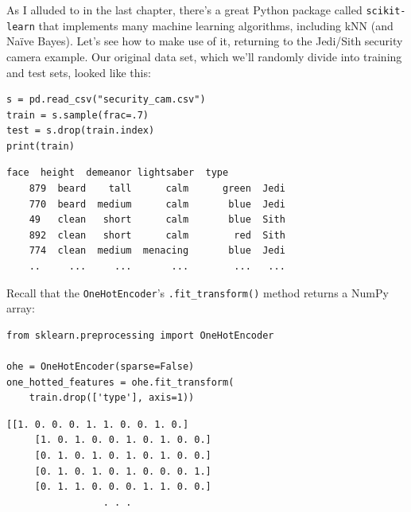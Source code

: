 
As I alluded to in the last chapter, there's a great Python package called
\texttt{scikit-learn} that implements many machine learning algorithms,
including kNN (and Na\"{i}ve Bayes). Let's see how to make use of it, returning
to the Jedi/Sith security camera example. Our original data set, which we'll
randomly divide into training and test sets, looked like this:

\begin{Verbatim}[fontsize=\small,samepage=true,frame=single,framesep=3mm]
s = pd.read_csv("security_cam.csv")
train = s.sample(frac=.7)
test = s.drop(train.index)
print(train)
\end{Verbatim}
\vspace{-.2in}

\begin{Verbatim}[fontsize=\small,samepage=true,frame=leftline,framesep=5mm,framerule=1mm]
          face  height  demeanor lightsaber  type
    879  beard    tall      calm      green  Jedi
    770  beard  medium      calm       blue  Jedi
    49   clean   short      calm       blue  Sith
    892  clean   short      calm        red  Sith
    774  clean  medium  menacing       blue  Jedi
    ..     ...     ...       ...        ...   ...
\end{Verbatim}


Recall that the \texttt{OneHotEncoder}'s \texttt{.fit\_transform()} method
returns a NumPy array:


\begin{Verbatim}[fontsize=\small,samepage=true,frame=single,framesep=3mm]
from sklearn.preprocessing import OneHotEncoder

ohe = OneHotEncoder(sparse=False)
one_hotted_features = ohe.fit_transform(
    train.drop(['type'], axis=1))
\end{Verbatim}
\vspace{-.2in}

\begin{Verbatim}[fontsize=\small,samepage=true,frame=leftline,framesep=5mm,framerule=1mm]
    [[1. 0. 0. 0. 1. 1. 0. 0. 1. 0.]
     [1. 0. 1. 0. 0. 1. 0. 1. 0. 0.]
     [0. 1. 0. 1. 0. 1. 0. 1. 0. 0.]
     [0. 1. 0. 1. 0. 1. 0. 0. 0. 1.]
     [0. 1. 1. 0. 0. 0. 1. 1. 0. 0.]
                 . . .
\end{Verbatim}

